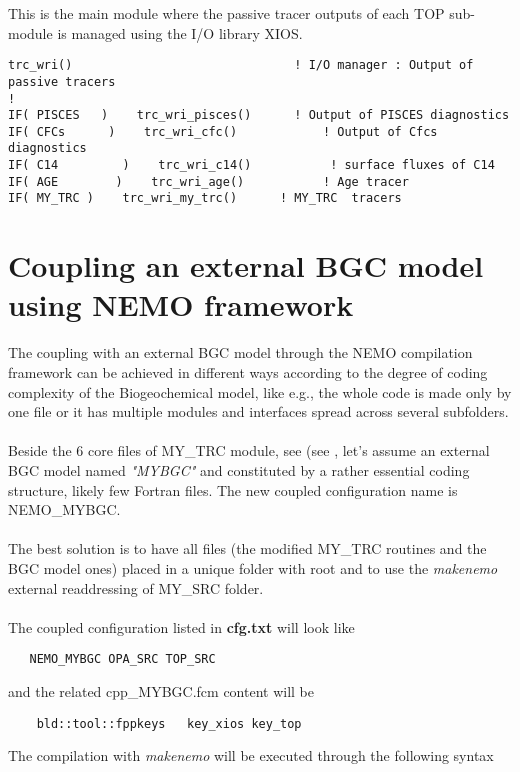 \documentclass[../main/TOP_manual]{subfiles}
\begin{document}
This is the main module where the passive tracer outputs of each TOP sub-module is managed using the I/O library XIOS.

\begin{verbatim}
trc_wri()                               ! I/O manager : Output of passive tracers 
!
IF( PISCES   )    trc_wri_pisces()      ! Output of PISCES diagnostics 
IF( CFCs      )    trc_wri_cfc()            ! Output of Cfcs diagnostics
IF( C14         )    trc_wri_c14()           ! surface fluxes of C14
IF( AGE        )    trc_wri_age()           ! Age tracer
IF( MY_TRC )    trc_wri_my_trc()      ! MY_TRC  tracers
\end{verbatim}

\section{Coupling an external BGC model using NEMO framework}

The coupling with an external BGC model through the NEMO compilation framework can be achieved in different ways according to the degree of coding complexity of the Biogeochemical model, like e.g., the whole code is made only by one file or it has multiple modules and interfaces spread across several subfolders.\\ \\
Beside the 6 core files of MY\_TRC module, see (see \label{Mytrc}, let's assume an external BGC model named \textit{"MYBGC"} and constituted by a rather essential coding structure, likely few Fortran files. The new coupled configuration name is NEMO\_MYBGC. \\ \\
The best solution is to have all files (the modified MY\_TRC routines and the BGC model ones) placed in a unique folder with root  and to use the \textit{makenemo} external readdressing of MY\_SRC folder. \\ \\
The coupled configuration listed in \textbf{cfg.txt}  will look like

\begin{verbatim}
   NEMO_MYBGC OPA_SRC TOP_SRC
\end{verbatim}
and the related cpp\_MYBGC.fcm content will be
%
\begin{verbatim}
    bld::tool::fppkeys   key_xios key_top
\end{verbatim}

The compilation with \textit{makenemo} will be executed through the following syntax
\end{document}
